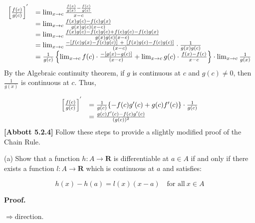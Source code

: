 \documentclass[10pt]{article}
\begin{document}
\begin{equation*}
\begin{array}{ c l }
\left[\frac{f( c)}{g( c)}\right]^{'} & =\lim _{x\rightarrow c}\frac{\frac{f( x)}{g( x)} -\frac{f( c)}{g( c)}}{x-c}\\
 & =\lim _{x\rightarrow c}\frac{f( x) g( c) -f( c) g( x)}{g( x) g( c)( x-c)}\\
 & =\lim _{x\rightarrow c}\frac{f( x) g( c) -f( c) g( c) +f( c) g( c) -f( c) g( x)}{g( x) g( c)( x-c)}\\
 & =\lim _{x\rightarrow c}\frac{-[ f( c) g( x) -f( c) g( c)] \ +\ [ f( x) g( c) -f( c) g( c)]}{( x-c)} \cdot \frac{1}{g( x) g( c)}\\
 & =\frac{1}{g( c)}\left\{\lim _{x\rightarrow c} f( c) \cdot \frac{-[ g( x) -g( c)]}{( x-c)} +\lim _{x\rightarrow c} g( c) \cdot \frac{f( x) -f( c)}{x-c}\right\} \cdot \lim _{x\rightarrow c}\frac{1}{g( x)}
\end{array}
\end{equation*}
By the Algebraic continuity theorem, if $\displaystyle g$ is continuous at $\displaystyle c$ and $\displaystyle g( c) \neq 0$, then $\displaystyle \frac{1}{g( x)}$ is continuous at $\displaystyle c$. Thus,


\begin{equation*}
\begin{array}{ c l }
\left[\frac{f( c)}{g( c)}\right]^{'} & =\frac{1}{g( c)}\{-f( c) g'( c) +g( c) f'( c)\} \cdot \frac{1}{g( c)}\\
 & =\frac{g( c) f'( c) -f( c) g'( c)}{( g( c))^{2}}
\end{array}
\end{equation*}
\textbf{[Abbott 5.2.4]} Follow these steps to provide a slightly modified proof of the Chain Rule.



(a) Show that a function $\displaystyle h:A\rightarrow \mathbf{R}$ is differentiable at $\displaystyle a\in A$ if and only if there exists a function $\displaystyle l:A\rightarrow \mathbf{R}$ which is continuous at $\displaystyle a$ and satisfies:


\begin{equation*}
h( x) -h( a) =l( x)( x-a) \quad \text{for all} \ x\in A
\end{equation*}


\textbf{Proof.}



$\displaystyle \Longrightarrow $direction.
\end{document}
